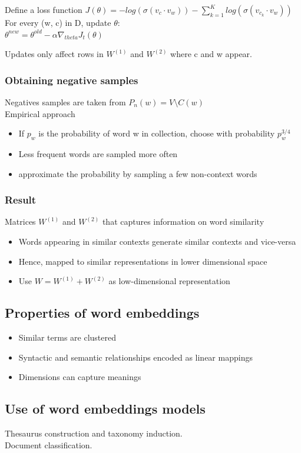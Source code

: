 Define a loss function $ J(\theta) = - log(\sigma(v_c \cdot v_w)) -
\sum_{k=1}^K log(\sigma(v_{c_k} \cdot v_w)) $ \\
For every (w, c) in D, update $ \theta $: \\
$ \theta^{new} = \theta^{old} - \alpha \nabla_{theta} J_t(\theta) $

Updates only affect rows in $ W^{(1)} $ and $ W^{(2)} $ where c and w
appear.

\subsubsection{Obtaining negative samples}
Negatives samples are taken from $ P_n(w) = V \setminus C(w) $ \\
Empirical approach
\begin{itemize}
\item If $ p_w $ is the probability of word w in collection, choose
  with probability $ p_w^{3/4} $
\item Less frequent words are sampled more often
\item approximate the probability by sampling a few non-context words
\end{itemize}

\subsubsection{Result}
Matrices $ W^{(1)} $ and $ W^{(2)} $ that captures information on word
similarity
\begin{itemize}
\item Words appearing in similar contexts generate similar contexts
  and vice-versa
\item Hence, mapped to similar representations in lower dimensional
  space
\item Use $ W = W^{(1)} + W^{(2)} $ as low-dimensional representation
\end{itemize}

\subsection{Properties of word embeddings}
\begin{itemize}
\item Similar terms are clustered
\item Syntactic and semantic relationships encoded as linear mappings
\item Dimensions can capture meanings
\end{itemize}

\subsection{Use of word embeddings models}
Thesaurus construction and taxonomy induction. \\
Document classification.


